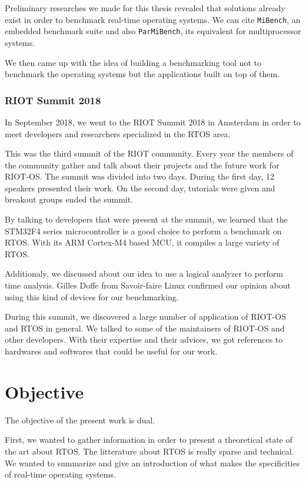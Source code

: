 Preliminary researches we made for this thesis revealed that solutions already exist in order to benchmark real-time operating systems.
We can cite \texttt{MiBench}, an embedded benchmark suite and also \texttt{ParMiBench}, its equivalent for multiprocessor systems.

We then came up with the idea of building a benchmarking tool not to benchmark the operating systems but the applications built on top of them.

\subsubsection*{RIOT Summit 2018}
In September 2018, we went to the RIOT Summit 2018 in Amsterdam in order to meet developers and researchers specialized in the RTOS area.

This was the third summit of the RIOT community.
Every year the members of the community gather and talk about their projects and the future work for RIOT-OS.
The summit was divided into two days. 
During the first day, 12 speakers presented their work. 
On the second day, tutorials were given and breakout groups ended the summit.

By talking to developers that were present at the summit, we learned that the STM32F4 series microcontroller is a good choice to perform a benchmark on RTOS. 
With its ARM Cortex-M4 based MCU, it compiles a large variety of RTOS.

Additionaly, we discussed about our idea to use a logical analyzer to perform time analysis. 
Gilles Doffe from Savoir-faire Linux confirmed our opinion about using this kind of devices for our benchmarking.

During this summit, we discovered a large number of application of RIOT-OS and RTOS in general.
We talked to some of the maintainers of RIOT-OS and other developers. 
With their expertise and their advices, we got references to hardwares and softwares that could be useful for our work.

%
%
\section*{Objective}
The objective of the present work is dual.

First, we wanted to gather information in order to present a theoretical state of the art about RTOS.
The litterature about RTOS is really sparse and technical.
We wanted to summarize and give an introduction of what makes the specificities of real-time operating systems.

